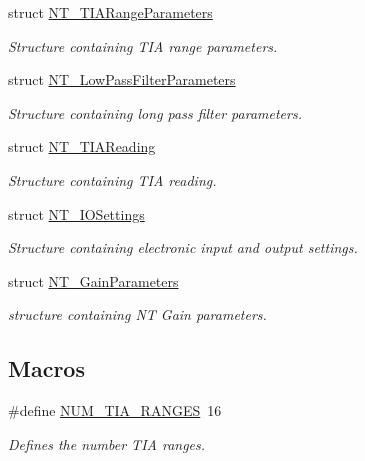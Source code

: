 \begin{DoxyCompactItemize}
struct \hyperlink{struct_n_t___t_i_a_range_parameters}{N\+T\+\_\+\+T\+I\+A\+Range\+Parameters}
\begin{DoxyCompactList}\small\item\em Structure containing T\+IA range parameters. \end{DoxyCompactList}\item 
struct \hyperlink{struct_n_t___low_pass_filter_parameters}{N\+T\+\_\+\+Low\+Pass\+Filter\+Parameters}
\begin{DoxyCompactList}\small\item\em Structure containing long pass filter parameters. \end{DoxyCompactList}\item 
struct \hyperlink{struct_n_t___t_i_a_reading}{N\+T\+\_\+\+T\+I\+A\+Reading}
\begin{DoxyCompactList}\small\item\em Structure containing T\+IA reading. \end{DoxyCompactList}\item 
struct \hyperlink{struct_n_t___i_o_settings}{N\+T\+\_\+\+I\+O\+Settings}
\begin{DoxyCompactList}\small\item\em Structure containing electronic input and output settings. \end{DoxyCompactList}\item 
struct \hyperlink{struct_n_t___gain_parameters}{N\+T\+\_\+\+Gain\+Parameters}
\begin{DoxyCompactList}\small\item\em structure containing NT Gain parameters. \end{DoxyCompactList}\end{DoxyCompactItemize}
\subsection*{Macros}
\begin{DoxyCompactItemize}
\item 
\#define \hyperlink{group___benchtop_nano_trak_ga71c4ccd426f774dbc92d38deb456bdb1}{N\+U\+M\+\_\+\+T\+I\+A\+\_\+\+R\+A\+N\+G\+ES}~16
\begin{DoxyCompactList}\small\item\em Defines the number T\+IA ranges. \end{DoxyCompactList}\end{DoxyCompactItemize}
